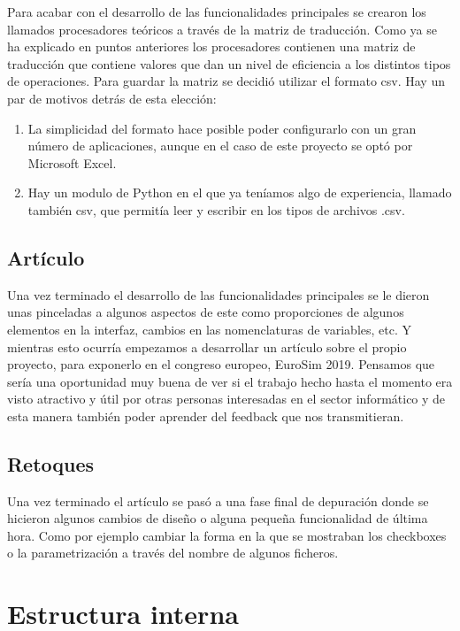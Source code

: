 Para acabar con el desarrollo de las funcionalidades principales se crearon los llamados procesadores teóricos a través de la matriz de traducción. Como ya se ha explicado en puntos anteriores los procesadores contienen una matriz de traducción que contiene valores que dan un nivel de eficiencia a los distintos tipos de operaciones. Para guardar la matriz se decidió utilizar el formato csv. Hay un par de motivos detrás de esta elección:\\

\begin{enumerate}
	\item La simplicidad del formato hace posible poder configurarlo con un gran número de aplicaciones, aunque en el caso de este proyecto se optó por Microsoft Excel.
	\item Hay un modulo de Python en el que ya teníamos algo de experiencia, llamado también csv, que permitía leer y escribir en los tipos de archivos .csv.
\end{enumerate}



\subsection{Artículo}

Una vez terminado el desarrollo de las funcionalidades principales se le dieron unas pinceladas a algunos aspectos de este como proporciones de algunos  elementos en la interfaz, cambios en las nomenclaturas de variables, etc. Y mientras esto ocurría empezamos a desarrollar un artículo sobre el propio proyecto, para exponerlo en el congreso europeo, EuroSim 2019. Pensamos que sería una oportunidad muy buena de ver si el trabajo hecho hasta el momento era visto atractivo y útil por otras personas interesadas en el sector informático y de esta manera también poder aprender del feedback que nos transmitieran.

\subsection{Retoques}
Una vez terminado el artículo se pasó a una fase final de depuración donde se hicieron algunos cambios de diseño o alguna pequeña funcionalidad de última hora. Como por ejemplo cambiar la forma en la que se mostraban los checkboxes\cite{Checkbo}\cite{checkbox} o la parametrización a través del nombre de algunos ficheros.

\section{Estructura interna}


